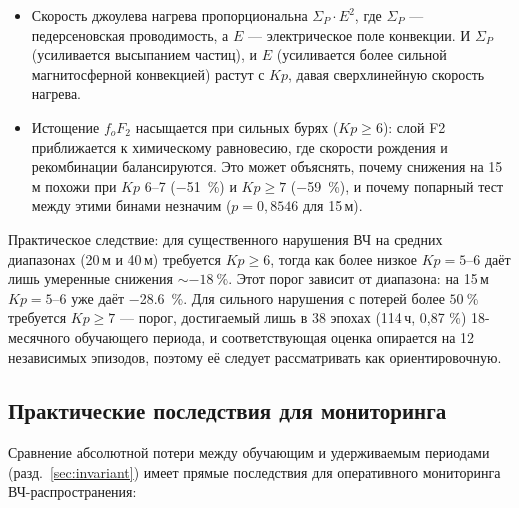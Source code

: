 \documentclass{agujournal2019}
\begin{document}
\begin{itemize}
	\item Скорость джоулева нагрева пропорциональна $\Sigma_P \cdot E^2$,
	      где $\Sigma_P$ — педерсеновская проводимость, а $E$ — электрическое
	      поле конвекции. И $\Sigma_P$ (усиливается высыпанием частиц),
	      и $E$ (усиливается более сильной магнитосферной конвекцией) растут
	      с $Kp$, давая сверхлинейную скорость нагрева.
	\item Истощение $f_oF_2$ насыщается при сильных бурях ($Kp \ge 6$):
	      слой F2 приближается к химическому равновесию, где скорости
	      рождения и рекомбинации балансируются. Это может объяснять,
	      почему снижения на 15\,м похожи при $Kp$ 6--7 (\SI{-51}{\percent})
	      и $Kp \ge 7$ (\SI{-59}{\percent}), и почему попарный тест между
	      этими бинами незначим ($p = 0{,}8546$ для 15\,м).
\end{itemize}

Практическое следствие: для существенного нарушения ВЧ на средних
диапазонах (20\,м и 40\,м) требуется $Kp \ge 6$, тогда как более низкое
$Kp = 5\text{--}6$ даёт лишь умеренные снижения $\sim\SI{-18}{\percent}$.
Этот порог зависит от диапазона: на 15\,м $Kp = 5\text{--}6$ уже даёт
\SI{-28.6}{\percent}. Для сильного нарушения с потерей более
$\SI{50}{\percent}$ требуется $Kp \ge 7$ — порог, достигаемый лишь
в 38 эпохах (114\,ч, 0,87 \%) 18-месячного обучающего периода,
и соответствующая оценка опирается на 12 независимых эпизодов, поэтому её
следует рассматривать как ориентировочную.

\subsection{Практические последствия для мониторинга}

Сравнение абсолютной потери между обучающим и удерживаемым периодами
(разд.~\ref{sec:invariant}) имеет прямые последствия для оперативного
мониторинга ВЧ-распространения:
\end{document}
